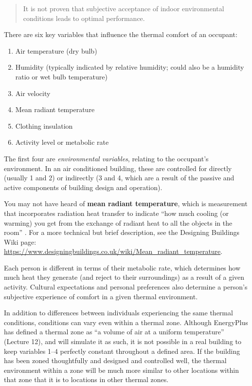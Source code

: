 \documentclass[10pt]{article}
\begin{document}
\begin{quote}
It is not proven that subjective acceptance of indoor environmental conditions leads to optimal performance. \cite{Wargocki2017-ny}
\end{quote}

\noindent
There are six key variables that influence the thermal comfort of an occupant:

\begin{enumerate}
    \item Air temperature (dry bulb)
    \item Humidity (typically indicated by relative humidity; could also be a humidity ratio or wet bulb temperature)
    \item Air velocity
    \item Mean radiant temperature
    \item Clothing insulation
    \item Activity level or metabolic rate
\end{enumerate}

The first four are \textit{environmental variables}, relating to the occupant's environment. In an air conditioned building, these are controlled for directly (usually 1 and 2) or indirectly (3 and 4, which are a result of the passive and active components of building design and operation). 

You may not have heard of \textbf{mean radiant temperature}, which is measurement that incorporates radiation heat transfer to indicate ``how much cooling (or warming) you get from the exchange of radiant heat to all the objects in the room'' \cite{noauthor_undated-kj}. For a more technical but brief description, see the Designing Buildings Wiki page: \url{https://www.designingbuildings.co.uk/wiki/Mean_radiant_temperature}.

Each person is different in terms of their metabolic rate, which determines how much heat they generate (and reject to their surroundings) as a result of a given activity. Cultural expectations and personal preferences also determine a person's subjective experience of comfort in a given thermal environment. 

In addition to differences between individuals experiencing the same thermal conditions, conditions can vary even within a thermal zone. Although EnergyPlus has defined a thermal zone as ``a volume of air at a uniform temperature'' (Lecture 12), and will simulate it as such, it is not possible in a real building to keep variables 1--4 perfectly constant throughout a defined area. If the building has been zoned thoughtfully and designed and controlled well, the thermal environment within a zone will be much more similar to other locations within that zone that it is to locations in other thermal zones.
\end{document}
